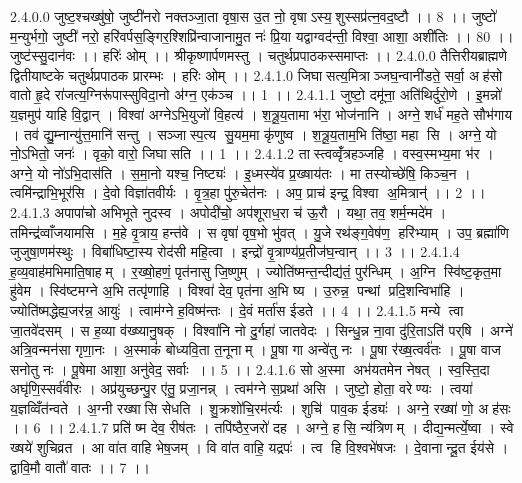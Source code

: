 2.4.0.0
जुष्ट॒श्चख्षु॑षो॒ जुष्टी॑नरो नक्तञ्जा॒ता वृषा॒स उ॒त नो॒ वृषाऽस्य॒॒शुस्सप्र॑त्न॒वद॒ष्टौ ।। 8 ।। जुष्टो॑ म॒न्युर्भगो॒ जुष्टी॑ नरो॒ हरि॑वर्पस॒ङ्गिर॒श्शिप्रि॑न्वाजानामु॒त नः॑ प्रि॒या यद्वाग्वद॑न्ती॒ विश्वा॒ आशा॒ अशी॑तिः ।। 80 ।। जुष्ट॑स्सु॒दान॑वः ।। हरिः॑ ओम् ।। श्रीकृष्णार्पणमस्तु । चतुर्थप्रपाठकस्समाप्तः ।।
2.4.0.0
तैत्तिरीयब्राह्मणे द्वितीयाष्टके चतुर्थप्रपाठक प्रारम्भः । हरिः ओम् ।।
2.4.1.0
जिघा॑सत्य॒मित्राञ्जघ॒न्वानी॑डते॒ सर्वा॒ अह॑सो वातो हृ॒दे रा॑जत्य॒ग्निरू॑पास्सुविदा॒नो अ॑ग्न॒ एक॑ञ्च ।। 1 ।।
2.4.1.1
जुष्टो॒ दमू॑ना॒ अति॑थिर्दुरो॒णे । इ॒मन्नो॑ य॒ज्ञमुप॑ याहि वि॒द्वान् । विश्वा॑ अग्नेऽभि॒युजो॑ वि॒हत्य॑ । श॒त्रू॒य॒तामा भ॑रा॒ भोज॑नानि । अग्ने॒ शर्ध॑ मह॒ते सौभ॑गाय । तव॑ द्यु॒म्नान्यु॑त्त॒मानि॑ सन्तु । सञ्जास्प॒त्य सु॒यम॒मा कृ॑णुष्व । श॒त्रू॒य॒ताम॒भि ति॑ष्ठा॒ महा॑ सि । अग्ने॒ यो नो॒ऽभितो॒ जनः॑ । वृको॒ वारो॒ जिघा॑सति ।। 1 ।।
2.4.1.2
तास्त्वव्वृँ॑त्रहञ्जहि । वस्व॒स्मभ्य॒मा भ॑र । अग्ने॒ यो नो॑ऽभि॒दास॑ति । स॒मा॒नो यश्च॒ निष्ट्यः॑ । इ॒ध्मस्ये॑व प्र॒ख्षाय॑तः । मा तस्योच्छे॑षि॒ किञ्च॒न । त्वमि॑न्द्राभि॒भूर॑सि । दे॒वो विज्ञा॑तवीर्यः । वृ॒त्र॒हा पु॑रु॒चेत॑नः । अप॒ प्राच॑ इन्द्र॒ विश्वा॑ अ॒मित्रान्॑ ।। 2 ।।
2.4.1.3
अपापा॑चो अभिभूते नुदस्व । अपोदी॑चो॒ अप॑शूराध॒रा च॑ ऊ॒रौ । यथा॒ तव॒ शर्म॒न्मदे॑म । तमिन्द्र॑व्वाँजयामसि । म॒हे वृ॒त्राय॒ हन्त॑वे । स वृषा॑ वृष॒भो भु॑वत् । यु॒जे रथ॑ङ्ग॒वेष॑ण॒॒ हरि॑भ्याम् । उप॒ ब्रह्मा॑णि जुजुषा॒णम॑स्थुः । विबा॑धिष्टा॒स्य रोद॑सी महि॒त्वा । इन्द्रो॑ वृ॒त्राण्य॑प्र॒तीज॑घ॒न्वान् ।। 3 ।।
2.4.1.4
ह॒व्य॒वाह॑मभिमाति॒षाहम् । र॒ख्षो॒हणं॒ पृत॑नासु जि॒ष्णुम् । ज्योति॑ष्मन्त॒न्दीद्य॑तं॒ पुर॑न्धिम् । अ॒ग्नि स्वि॑ष्ट॒कृत॒मा हु॑वेम । स्वि॑ष्टमग्ने अ॒भि तत्पृ॑णाहि । विश्वा॑ देव॒ पृत॑ना अ॒भि ष्य । उ॒रुन्न॒ पन्थां प्रदि॒शन्विभा॑हि । ज्योति॑ष्मद्धेह्य॒जर॑न्न॒ आयुः॑ । त्वाम॑ग्ने ह॒विष्म॑न्तः । दे॒वं मर्ता॑स ईडते ।। 4 ।।
2.4.1.5
मन्ये त्वा जा॒तवे॑दसम् । स ह॒व्या व॑ख्ष्यानु॒षक् । विश्वा॑नि नो दु॒र्गहा॑ जातवेदः । सिन्धु॒न्न ना॒वा दु॑रि॒ताऽति॑ पर्‌षि । अग्ने॑ अत्रि॒वन्मन॑सा गृणा॒नः । अ॒स्माकं॑ बोध्यवि॒ता त॒नूनाम् । पू॒षा गा अन्वे॑तु नः । पू॒षा र॑ख्ष॒त्वर्व॑तः । पू॒षा वाज॑ सनोतु नः । पू॒षेमा आशा॒ अनु॑वेद॒ सर्वाः ।। 5 ।।
2.4.1.6
सो अ॒स्मा अभ॑यतमेन नेषत् । स्व॒स्ति॒दा अघृ॑णि॒स्सर्व॑वीरः । अप्र॑युच्छन्पु॒र ए॑तु॒ प्रजा॒नन्न् । त्वम॑ग्ने स॒प्रथा॑ असि । जुष्टो॒ होता॒ वरेण्यः । त्वया॑ य॒ज्ञव्विँत॑न्वते । अ॒ग्नी रख्षा॑सि सेधति । शु॒क्रशो॑चि॒रम॑र्त्यः । शुचि॑ पाव॒क ईड्यः॑ । अग्ने॒ रख्षा॑ णो॒ अह॑सः ।। 6 ।।
2.4.1.7
प्रति॑ ष्म देव॒ रीष॑तः । तपि॑ष्ठैर॒जरो॑ दह । अग्ने॒ हसि॒ न्य॑त्रिणम् । दीद्य॒न्मर्त्ये॒ष्वा । स्वे ख्षये॑ शुचिव्रत । आ वा॑त वाहि भेष॒जम् । वि वा॑त वाहि॒ यद्रपः॑ । त्व हि वि॒श्वभे॑षजः । दे॒वानान्दू॒त ईय॑से । द्वावि॒मौ वातौ॑ वातः ।। 7 ।।
